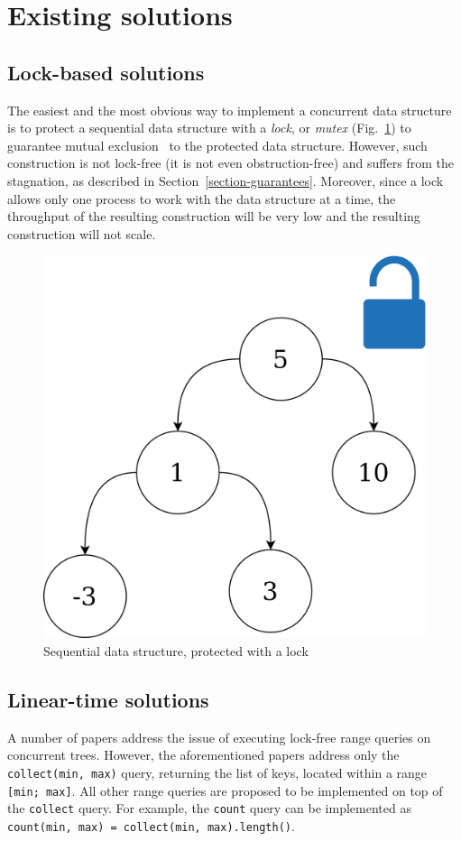 \documentclass[times, dvipsnames,%
               languages={russian,english} %
              ]{itmo-student-thesis}
\begin{document}
\section{Existing solutions}

\startrelatedwork

\subsection{Lock-based solutions}

The easiest and the most obvious way to implement a concurrent data structure is to protect a sequential data structure with a \emph{lock}, or \emph{mutex} (Fig.~\ref{lock-solution-pic}) to guarantee mutual exclusion~\cite{lamport2019new} to the protected data structure. However, such construction is not lock-free (it is not even obstruction-free) and suffers from the stagnation, as described in Section~\ref{section-guarantees}. Moreover, since a lock allows only one process to work with the data structure at a time, the throughput of the resulting construction will be very low and the resulting construction will not scale.

\begin{figure}[H]
  \centering
  \caption{Sequential data structure, protected with a lock}
  \label{lock-solution-pic}
  \includegraphics[width=0.5\linewidth]{pics/lock-solution.png}
\end{figure}


\subsection{Linear-time solutions}

A number of papers \cite{arbel2018harnessing, brown2012range} address the issue of executing lock-free range queries on concurrent trees. However, the aforementioned papers address only the \texttt{collect(min, max)} query, returning the list of keys, located within a range \texttt{[min; max]}. All other range queries are proposed to be implemented on top of the \texttt{collect} query. For example, the \texttt{count} query can be implemented as \texttt{count(min, max) = collect(min, max).length()}. 
\end{document}
